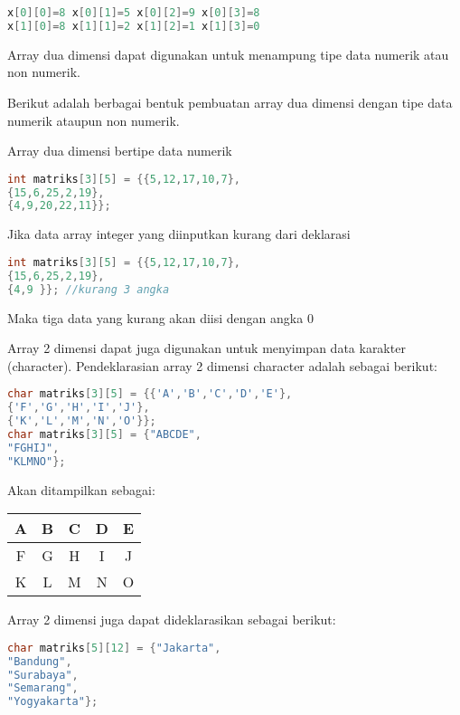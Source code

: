 \begin{lstlisting}[language=c++, numbers=none]
x[0][0]=8 x[0][1]=5 x[0][2]=9 x[0][3]=8
x[1][0]=8 x[1][1]=2 x[1][2]=1 x[1][3]=0
\end{lstlisting}

Array dua dimensi dapat digunakan untuk menampung tipe data numerik atau
non numerik.

Berikut adalah berbagai bentuk pembuatan array dua dimensi dengan tipe
data numerik ataupun non numerik.

Array dua dimensi bertipe data numerik

\begin{lstlisting}[language=c++, numbers=none]
int matriks[3][5] = {{5,12,17,10,7},
{15,6,25,2,19},
{4,9,20,22,11}};
\end{lstlisting}

Jika data array integer yang diinputkan kurang dari deklarasi

\begin{lstlisting}[language=c++, numbers=none]
int matriks[3][5] = {{5,12,17,10,7},
{15,6,25,2,19},
{4,9 }}; //kurang 3 angka
\end{lstlisting}

Maka tiga data yang kurang akan diisi dengan angka 0

Array 2 dimensi dapat juga digunakan untuk menyimpan data karakter
(character). Pendeklarasian array 2 dimensi character adalah sebagai
berikut:

\begin{lstlisting}[language=c++, numbers=none]
char matriks[3][5] = {{'A','B','C','D','E'},
{'F','G','H','I','J'},
{'K','L','M','N','O'}};
char matriks[3][5] = {"ABCDE",
"FGHIJ",
"KLMNO"};
\end{lstlisting}

Akan ditampilkan sebagai:

\begin{tabular}{|c|c|c|c|c|}
\hline
A &B &C& D& E \\ \hline
F &G &H &I& J \\ \hline
K &L &M& N& O \\ \hline

\end{tabular}

Array 2 dimensi juga dapat dideklarasikan sebagai berikut:

\begin{lstlisting}[language=c++, numbers=none]
char matriks[5][12] = {"Jakarta",
"Bandung",
"Surabaya",
"Semarang",
"Yogyakarta"};
\end{lstlisting}

